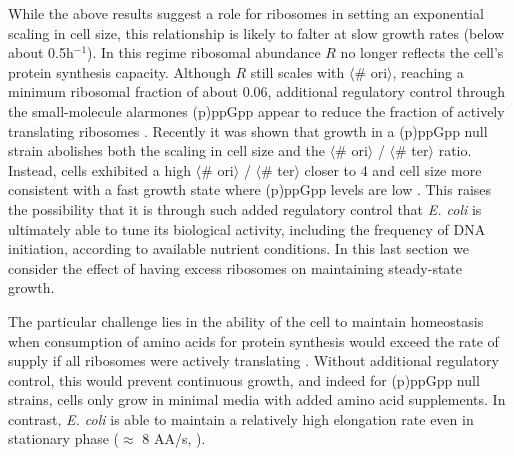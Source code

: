 While the above results suggest a role for ribosomes in setting an
exponential scaling in cell size, this relationship is likely to falter at slow
growth rates (below about 0.5h$^{-1}$). In this regime ribosomal abundance $R$
no longer reflects the cell's protein synthesis capacity.
Although $R$ still scales with $\langle$\# ori$\rangle$, reaching a minimum
ribosomal fraction of about 0.06, additional regulatory control through the
small-molecule alarmones (p)ppGpp appear to reduce the fraction of actively
translating ribosomes \citep{dai2016, bosdriesz2015, zhu2019}. Recently it
was shown that growth in a (p)ppGpp null strain abolishes both the scaling in
cell size and the $\langle$\# ori$\rangle$ / $\langle$\# ter$\rangle$ ratio.
Instead, cells exhibited a high $\langle$\# ori$\rangle$ / $\langle$\#
ter$\rangle$ closer to 4 and cell size more consistent with a fast growth state
where (p)ppGpp levels are low \citep{fernandezcoll2020}. This raises the
possibility that it is through such added regulatory control that \textit{E.
coli} is ultimately able to tune its biological activity, including the frequency of DNA
initiation, according to available nutrient conditions.
In this last section we consider the effect of having
excess ribosomes on maintaining steady-state growth.


The particular challenge lies in the ability of the cell to maintain homeostasis
when consumption of amino acids for protein synthesis would exceed the rate of
supply if all ribosomes were actively translating
. Without additional regulatory control, this
would prevent continuous growth, and indeed for (p)ppGpp null strains, cells
only grow in minimal media with added amino acid supplements. In contrast,
\textit{E. coli} is able to maintain a relatively high elongation rate even in
stationary phase ($\approx$ 8 AA/s, \citep{dai2016, dai2018}).

